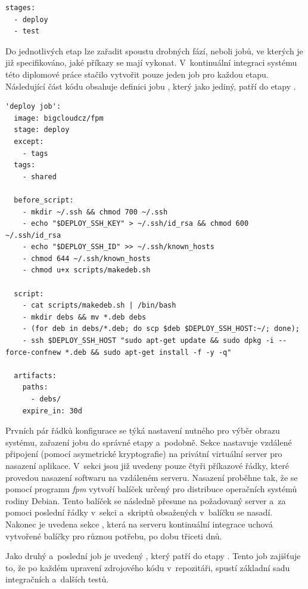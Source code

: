 \documentclass[thesis=M,czech]{FITthesis}[2012/06/26]
\begin{document}
\begin{lstlisting}[identifierstyle=\color{black}]
stages:
  - deploy
  - test
\end{lstlisting}

Do jednotlivých etap lze zařadit spoustu drobných fází, neboli jobů, ve kterých je již specifikováno, jaké příkazy se mají vykonat. V~kontinuální integraci systému této diplomové práce stačilo vytvořit pouze jeden job pro každou etapu. Následující část kódu obsahuje definici jobu , který jako jediný, patří do etapy .\\

\begin{lstlisting}[identifierstyle=\color{black}]
'deploy job':
  image: bigcloudcz/fpm
  stage: deploy
  except:
    - tags
  tags: 
    - shared

  before_script:
    - mkdir ~/.ssh && chmod 700 ~/.ssh
    - echo "$DEPLOY_SSH_KEY" > ~/.ssh/id_rsa && chmod 600 ~/.ssh/id_rsa
    - echo "$DEPLOY_SSH_ID" >> ~/.ssh/known_hosts
    - chmod 644 ~/.ssh/known_hosts
    - chmod u+x scripts/makedeb.sh

  script:
    - cat scripts/makedeb.sh | /bin/bash
    - mkdir debs && mv *.deb debs
    - (for deb in debs/*.deb; do scp $deb $DEPLOY_SSH_HOST:~/; done);
    - ssh $DEPLOY_SSH_HOST "sudo apt-get update && sudo dpkg -i --force-confnew *.deb && sudo apt-get install -f -y -q"

  artifacts:
    paths:
      - debs/
    expire_in: 30d
\end{lstlisting}

Prvních pár řádků konfigurace  se týká nastavení nutného pro výběr obrazu systému, zařazení jobu do správné etapy a~podobně. Sekce  nastavuje vzdálené připojení (pomocí asymetrické kryptografie) na privátní virtuální server pro nasazení aplikace. V~sekci  jsou již uvedeny pouze čtyři příkazové řádky, které provedou nasazení softwaru na vzdáleném serveru. Nasazení proběhne tak, že se pomocí programu \textit{fpm} vytvoří balíček určený pro distribuce operačních systémů rodiny Debian. Tento balíček se následně přesune na požadovaný server a~za pomoci poslední řádky v~sekci  a~skriptů obsažených v~balíčku se nasadí. Nakonec je uvedena sekce , která na serveru kontinuální integrace uchová vytvořené balíčky pro různou potřebu, po dobu třiceti dnů.

Jako druhý a~poslední job je uvedený , který patří do etapy . Tento job zajišťuje to, že po každém upravení zdrojového kódu v~repozitáři, spustí základní sadu integračních a~dalších testů.\\
\end{document}
